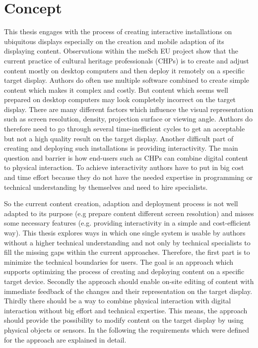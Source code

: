 
\chapter{Concept}
\label{chap:concept}

This thesis engages with the process of creating interactive installations on ubiquitous displays especially on the creation and mobile adaption of its displaying content. Observations within the meSch EU project show that the current practice of cultural heritage professionals (CHPs) is to create and adjust content mostly on desktop computers and then deploy it remotely on a specific target display. Authors do often use multiple software combined to create simple content which makes it complex and costly. But content which seems well prepared on desktop computers may look completely incorrect on the target display. There are many different factors which influence the visual representation such as screen resolution, density, projection surface or viewing angle. Authors do therefore need to go through several time-inefficient cycles to get an acceptable but not a high quality result on the target display. 
Another difficult part of creating and deploying such installations is providing interactivity. The main question and barrier is how end-users such as CHPs can combine digital content to physical interaction. To achieve interactivity authors have to put in big cost and time effort because they do not have the needed expertise in programming or technical understanding by themselves and need to hire specialists.

So the current content creation, adaption and deployment process is not well adapted to its purpose (e.g prepare content different screen resolution) and misses some necessary features (e.g. providing interactivity in a simple and cost-efficient way). This thesis explores ways in which one single system is usable by authors without a higher technical understanding and not only by technical specialists to fill the missing gaps within the current approaches. Therefore, the first part is to minimize the technical boundaries for users. The goal is an approach which supports optimizing the process of creating and deploying content on a specific target device. Secondly the approach should enable on-site editing of content with immediate feedback of the changes and their representation on the target display. Thirdly there should be a way to combine physical interaction with digital interaction without big effort and technical expertise. This means, the approach should provide the possibility to modify content on the target display by using physical objects or sensors. In the following the requirements which were defined for the approach are explained in detail.

